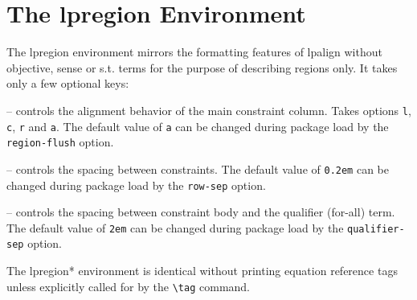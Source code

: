 \documentclass{article}
\begin{document}
\section{The \textsf{lpregion} Environment}\label{sec:lpregion}
The \textsf{lpregion} environment mirrors the formatting features of \textsf{lpalign} without objective, sense or s.t. terms for the purpose of describing regions only. It takes only a few optional keys:\Vtrg
  \begin{compactitem}
  \item[\Verb|flush|] -- controls the alignment behavior of the main constraint column. Takes options \verb|l|, \verb|c|, \verb|r| and \verb|a|. The default value of \verb|a| can be changed during package load by the \verb|region-flush| option.
  \item[\Verb|row-sep|] -- controls the spacing between constraints. The default value of \verb|0.2em| can be changed during package load by the \verb|row-sep| option.
  \item[\Verb|qualifier-sep|] -- controls the spacing between constraint body and the qualifier (for-all) term. The default value of \verb|2em| can be changed during package load by the \verb|qualifier-sep| option.
  \end{compactitem}
The \textsf{lpregion*} environment is identical without printing equation reference tags unless explicitly called for by the \verb|\tag| command.
\end{document}
